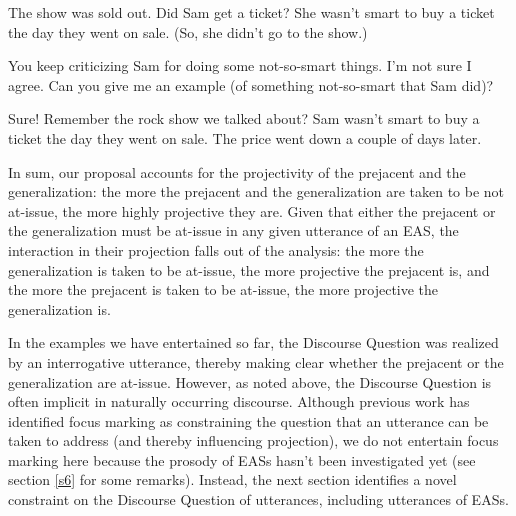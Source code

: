 \documentclass[11pt,fleqn]{article}
\newcommand{\6}{\mbox{$[\hspace*{-.6mm}[$}}
\newcommand{\9}{\mbox{$]\hspace*{-.6mm}]$}}
\begin{document}
\begin{exe}
\ex\label{ai2}

\begin{xlist}
\ex
\begin{xlist}
 The show was sold out. Did Sam get a ticket?
 She wasn't smart to buy a ticket the day they went on sale. (So, she didn't go to the show.)
\end{xlist}

\ex
\begin{xlist}

 You keep criticizing Sam for doing some not-so-smart things. I'm not sure I agree. Can you give me an example (of something not-so-smart that Sam did)?


 Sure! Remember the rock show we talked about? Sam wasn't smart to buy a ticket the day they went on sale. The price went down a couple of days later.

%

\end{xlist}

\end{xlist}
\end{exe}
In sum, our proposal accounts for the projectivity of the prejacent and the generalization: the more the prejacent and the generalization are taken to be not at-issue, the more highly projective they are. Given that either the prejacent or the generalization must be at-issue in any given utterance of an EAS, the interaction in their projection falls out of the analysis: the more the generalization is taken to be at-issue, the more projective the prejacent is, and the more the prejacent is taken to be at-issue, the more projective the generalization is.

In the examples we have entertained so far, the Discourse Question was realized by an interrogative utterance, thereby making clear whether the prejacent or the generalization are at-issue. However, as noted above, the Discourse Question is often implicit in naturally occurring discourse. Although previous work has identified focus marking as constraining the question that an utterance can be taken to address (and thereby influencing projection), we do not entertain focus marking here because the prosody of EASs hasn't been investigated yet (see section \ref{s6} for some remarks). Instead, the next section identifies a novel constraint on the Discourse Question of utterances, including utterances of EASs.
\end{document}
